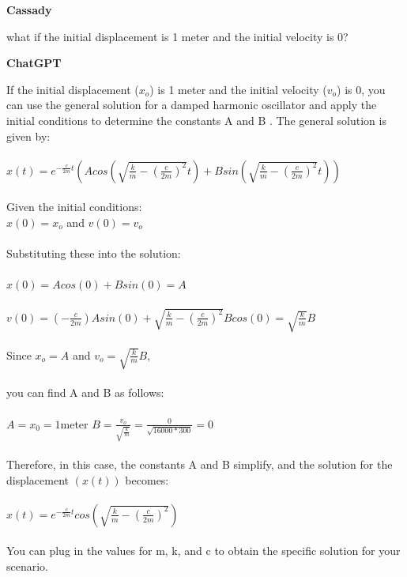 \documentclass{article}
\begin{document}
\begin{center}
    \textbf{Cassady}
\end{center}

what if the initial displacement is 1 meter and the initial velocity is 0?

\begin{center}
    \textbf{ChatGPT}
\end{center}

If the initial displacement ($x_o$) is 1 meter and the initial velocity ($v_o$) is 0, you can use the general solution for a damped harmonic oscillator and apply the initial conditions to determine the constants A and B . The general solution is given by:\\
\\
$x(t)=e^{ -\frac{c}{2m}t } \left( Acos \left( \sqrt{ \frac{k}{m}-\left(\frac{c}{2m}\right)^2 }t \right) + Bsin \left( \sqrt{ \frac{k}{m} - \left( \frac{c}{2m} \right)^2}t \right) \right)$\\
\\
Given the initial conditions:\\
$x(0)=x_o$ and $v(0)=v_o$\\
\\
Substituting these into the solution:\\
\\
$x(0)=Acos(0)+Bsin(0)=A$\\
\\
$v(0)=\left(-\frac{c}{2m} \right) Asin(0) + \sqrt{ \frac{k}{m}- \left( \frac{c}{2m} \right)^2} Bcos(0) = \sqrt{ \frac{k}{m} }B$\\
\\
Since $x_o=A$ and $v_o=\sqrt{ \frac{k}{m} }B$,\\
\\
you can find A and B as follows:\\
\\
$A=x_0=1$meter $B=\frac{v_o}{\sqrt{\frac{k}{m}}}=\frac{0}{\sqrt{16000*300}}=0$\\
\\
Therefore, in this case, the constants A and B simplify, and the solution for the displacement $(x(t))$ becomes:\\
\\
$x(t)=e^{-\frac{c}{2m}t} cos \left( \sqrt{ \frac{k}{m} - \left(\frac{c}{2m}\right)^2 } \right)$\\
\\
You can plug in the values for m, k, and c to obtain the specific solution for your scenario.
\end{document}
